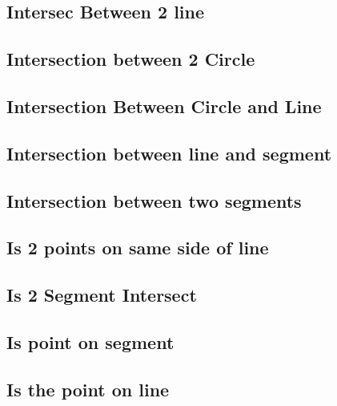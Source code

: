﻿\documentclass[10pt,twocolumn]{article}
\newcommand{\codefile}[1]{}}
\begin{document}
\subsection{Intersec Between 2 line}
\codefile{Geometry/Intersec Between 2 line.cpp}

\subsection{Intersection between 2 Circle}
\codefile{Geometry/Intersection between 2 Circle.cpp}

\subsection{Intersection Between Circle and Line}
\codefile{Geometry/Intersection Between Circle and Line.cpp}

\subsection{Intersection between line and segment}
\codefile{Geometry/Intersection between line and segment.cpp}

\subsection{Intersection between two segments}
\codefile{Geometry/Intersection between two segments.cpp}

\subsection{Is 2 points on same side of line}
\codefile{Geometry/Is 2 points on same side of line.cpp}

\subsection{Is 2 Segment Intersect}
\codefile{Geometry/Is 2 Segment Intersect.cpp}

\subsection{Is point on segment}
\codefile{Geometry/Is point on segment.cpp}

\subsection{Is the point on line}
\codefile{Geometry/Is the point on line.cpp}
\end{document}
